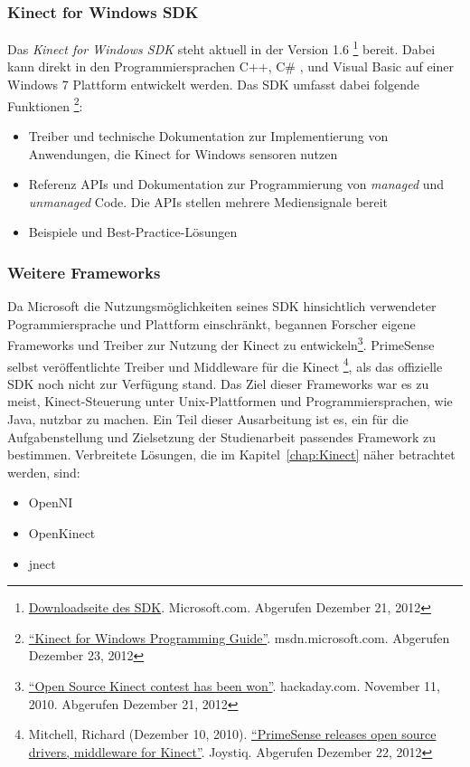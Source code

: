 \subsubsection{Kinect for Windows SDK}
\label{subsubsec:Kinect_SDK}
Das \textit{Kinect for Windows SDK} steht aktuell in der Version 1.6 \footnote{\href{https://www.microsoft.com/en-us/kinectforwindows/develop/}{Downloadseite des SDK}. Microsoft.com. Abgerufen Dezember 21, 2012}
bereit. Dabei kann direkt in den Programmiersprachen C++, C\# , und Visual Basic auf einer Windows 7 Plattform entwickelt werden.
\newline
Das SDK umfasst dabei folgende Funktionen \footnote{\href{http://msdn.microsoft.com/en-us/library/hh855348.aspx}{\enquote{Kinect for Windows Programming Guide}}. msdn.microsoft.com. Abgerufen Dezember 23, 2012}:
\begin{itemize}
  \item Treiber und technische Dokumentation zur Implementierung von Anwendungen, die Kinect for Windows sensoren nutzen
  \item Referenz APIs und Dokumentation zur Programmierung von \textit{managed} und \textit{unmanaged} Code.
  Die APIs stellen mehrere Mediensignale bereit
  \item Beispiele und Best-Practice-L\"osungen
\end{itemize}
\subsubsection{Weitere Frameworks}
Da Microsoft die Nutzungsm\"oglichkeiten seines SDK hinsichtlich verwendeter Pogrammiersprache und Plattform einschr\"ankt, begannen Forscher eigene Frameworks und Treiber zur Nutzung der Kinect zu entwickeln\footnote{\href{http://hackaday.com/2010/11/11/open-source-kinect-contest-has-been-won/}{\enquote{Open Source Kinect contest has been won}}. hackaday.com. November 11, 2010. Abgerufen Dezember 21, 2012}.
PrimeSense selbst ver\"offentlichte Treiber und Middleware f\"ur die Kinect \footnote{Mitchell, Richard (Dezember 10, 2010). \href{http://www.joystiq.com/2010/12/10/primesense-releases-open-source-drivers-middleware-for-kinect/}{\enquote{PrimeSense releases open source drivers, middleware for Kinect}}. Joystiq. Abgerufen Dezember 22, 2012}, 
als das offizielle SDK noch nicht zur Verf\"ugung stand.
\newline
Das Ziel dieser Frameworks war es zu meist, Kinect-Steuerung unter Unix-Plattformen und Programmiersprachen, wie Java, nutzbar zu machen.
Ein Teil dieser Ausarbeitung ist es, ein f\"ur die Aufgabenstellung und Zielsetzung der Studienarbeit passendes Framework zu bestimmen.
\newline
Verbreitete L\"osungen, die im Kapitel~\ref{chap:Kinect} n\"aher betrachtet werden, sind:
\begin{itemize}
  \item OpenNI
  \item OpenKinect
  \item jnect
\end{itemize}

